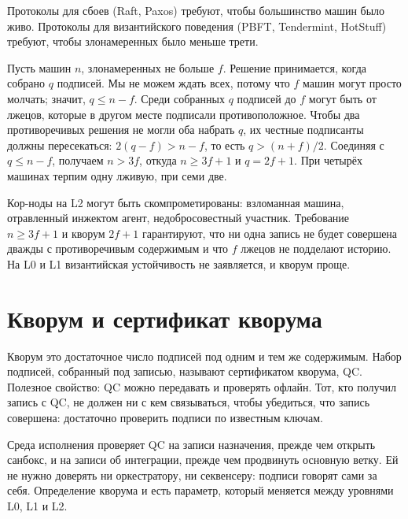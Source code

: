 Протоколы для сбоев (Raft, Paxos) требуют, чтобы большинство машин было живо. Протоколы для византийского поведения (PBFT, Tendermint, HotStuff) требуют, чтобы злонамеренных было меньше трети.

\begin{likbez}
Пусть машин $n$, злонамеренных не больше $f$. Решение принимается, когда собрано $q$ подписей. Мы не можем ждать всех, потому что $f$ машин могут просто молчать; значит, $q \leq n - f$. Среди собранных $q$ подписей до $f$ могут быть от лжецов, которые в другом месте подписали противоположное. Чтобы два противоречивых решения не могли оба набрать $q$, их честные подписанты должны пересекаться: $2(q - f) > n - f$, то есть $q > (n+f)/2$. Соединяя с $q \leq n - f$, получаем $n > 3f$, откуда $n \geq 3f + 1$ и $q = 2f + 1$. При четырёх машинах терпим одну лживую, при семи две.
\end{likbez}

\begin{likbez}
Кор-ноды на L2 могут быть скомпрометированы: взломанная машина, отравленный инжектом агент, недобросовестный участник. Требование $n \geq 3f+1$ и кворум $2f+1$ гарантируют, что ни одна запись не будет совершена дважды с противоречивым содержимым и что $f$ лжецов не подделают историю. На L0 и L1 византийская устойчивость не заявляется, и кворум проще.
\end{likbez}

\section{Кворум и сертификат кворума}

Кворум это достаточное число подписей под одним и тем же содержимым. Набор подписей, собранный под записью, называют сертификатом кворума, QC. Полезное свойство: QC можно передавать и проверять офлайн. Тот, кто получил запись с QC, не должен ни с кем связываться, чтобы убедиться, что запись совершена: достаточно проверить подписи по известным ключам.

\begin{likbez}
Среда исполнения проверяет QC на записи назначения, прежде чем открыть санбокс, и на записи об интеграции, прежде чем продвинуть основную ветку. Ей не нужно доверять ни оркестратору, ни секвенсеру: подписи говорят сами за себя. Определение кворума и есть параметр, который меняется между уровнями L0, L1 и L2.
\end{likbez}

